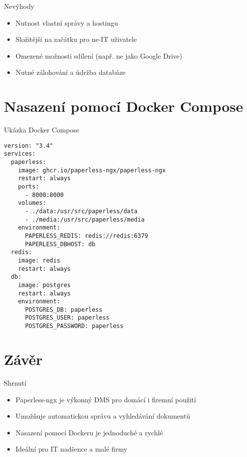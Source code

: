 \documentclass{beamer}
\begin{document}
\begin{frame}{Nevýhody}
  \begin{itemize}
    \item Nutnost vlastní správy a hostingu
    \item Složitější na začátku pro ne-IT uživatele
    \item Omezené možnosti sdílení (např. ne jako Google Drive)
    \item Nutné zálohování a údržba databáze
  \end{itemize}
\end{frame}

\section{Nasazení pomocí Docker Compose}

\begin{frame}[fragile]{Ukázka Docker Compose}
  \begin{lstlisting}
version: "3.4"
services:
  paperless:
    image: ghcr.io/paperless-ngx/paperless-ngx
    restart: always
    ports:
      - 8000:8000
    volumes:
      - ./data:/usr/src/paperless/data
      - ./media:/usr/src/paperless/media
    environment:
      PAPERLESS_REDIS: redis://redis:6379
      PAPERLESS_DBHOST: db
  redis:
    image: redis
    restart: always
  db:
    image: postgres
    restart: always
    environment:
      POSTGRES_DB: paperless
      POSTGRES_USER: paperless
      POSTGRES_PASSWORD: paperless
  \end{lstlisting}
\end{frame}

\section{Závěr}

\begin{frame}{Shrnutí}
  \begin{itemize}
    \item Paperless-ngx je výkonný DMS pro domácí i firemní použití
    \item Umožňuje automatickou správu a vyhledávání dokumentů
    \item Nasazení pomocí Dockeru je jednoduché a rychlé
    \item Ideální pro IT nadšence a malé firmy
  \end{itemize}
\end{frame}
\end{document}
